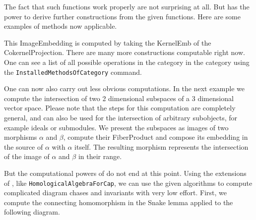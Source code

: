 \begin{small}

\end{small}

The fact that such functions work properly are not surprising at all. But \CapPkg has the power to derive
further constructions from the given functions. Here are some examples of methods now applicable.

\begin{small}

\end{small}

This \textrm{ImageEmbedding} is computed by taking the \textrm{KernelEmb} of the \textrm{CokernelProjection}.
There are many more constructions computable right now. One can see a list of all possible operations in the category
in the category using the \texttt{InstalledMethodsOfCategory} command.

\begin{small}

\end{small}

One can now also carry out less obvious computations. In the next example we compute the intersection of two 2 dimensional
subspaces of a 3 dimensional vector space. Please note that the steps for this computation are completely general, and
can also be used for the intersection of arbitrary subobjects, for example ideals or submodules. We present the
subspaces as images of two morphisms $\alpha$ and $\beta$, compute their \textrm{FiberProduct} and compose its embedding
in the source of $\alpha$ with $\alpha$ itself. The resulting morphism represents the intersection of the image of $\alpha$
and $\beta$ in their range.

\begin{small}
 
\end{small}

But the computational powers of \CapPkg do not end at this point. Using the extensions of \CapPkg, like \texttt{HomologicalAlgebraForCap},
we can use the given algorithms to compute complicated diagram chases and invariants with very low effort. First,
we compute the connecting homomorphism in the Snake lemma applied to the following diagram.

